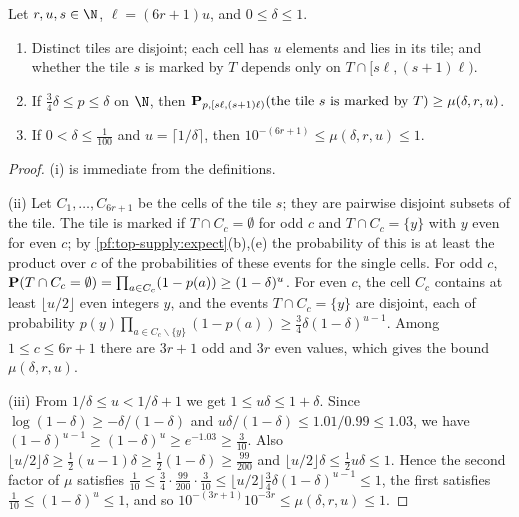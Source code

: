 \begin{lemma}\label{pf:top-supply:marked}
Let $r,u,s\in\N$, $\ell=(6r+1)u$, and $0\le\delta\le1$.
\begin{enumerate}[label=(\roman*)]
\item Distinct tiles are disjoint; each cell has $u$ elements and lies in its tile; and whether the tile $s$ is marked by
$T$ depends only on $T\cap[s\ell,(s+1)\ell)$.
\item If $\frac34\delta\le p\le\delta$ on $\N$, then $\mathbf{P}_{p,[s\ell,(s+1)\ell)}(\text{the tile }s\text{ is marked by }T)
\ge\mu(\delta,r,u)$.
\item If $0<\delta\le\frac1{100}$ and $u=\lceil1/\delta\rceil$, then $10^{-(6r+1)}\le\mu(\delta,r,u)\le1$.
\end{enumerate}
 
 
 
\end{lemma}

\begin{proof}
(i) is immediate from the definitions.

(ii) Let $C_1,\dots,C_{6r+1}$ be the cells of the tile $s$; they are pairwise disjoint subsets of the tile. The tile is
marked if $T\cap C_c=\emptyset$ for odd $c$ and $T\cap C_c=\{y\}$ with $y$ even for even $c$; by
\cref{pf:top-supply:expect}(b),(e) the probability of this is at least the product over $c$ of the probabilities of these
events for the single cells. For odd $c$, $\mathbf{P}(T\cap C_c=\emptyset)=\prod_{a\in C_c}(1-p(a))\ge(1-\delta)^u$. For
even $c$, the cell $C_c$ contains at least $\lfloor u/2\rfloor$ even integers $y$, and the events $T\cap C_c=\{y\}$ are
disjoint, each of probability $p(y)\prod_{a\in C_c\smallsetminus\{y\}}(1-p(a))\ge\frac34\delta(1-\delta)^{u-1}$. Among
$1\le c\le6r+1$ there are $3r+1$ odd and $3r$ even values, which gives the bound $\mu(\delta,r,u)$.

(iii) From $1/\delta\le u<1/\delta+1$ we get $1\le u\delta\le1+\delta$. Since $\log(1-\delta)\ge-\delta/(1-\delta)$ and
$u\delta/(1-\delta)\le1.01/0.99\le1.03$, we have $(1-\delta)^{u-1}\ge(1-\delta)^u\ge e^{-1.03}\ge\frac3{10}$. Also
$\lfloor u/2\rfloor\delta\ge\frac12(u-1)\delta\ge\frac12(1-\delta)\ge\frac{99}{200}$ and $\lfloor u/2\rfloor\delta\le\frac12u\delta\le1$.
Hence the second factor of $\mu$ satisfies
$\frac1{10}\le\frac34\cdot\frac{99}{200}\cdot\frac3{10}\le\lfloor u/2\rfloor\frac34\delta(1-\delta)^{u-1}\le1$, the first
satisfies $\frac1{10}\le(1-\delta)^u\le1$, and so $10^{-(3r+1)}10^{-3r}\le\mu(\delta,r,u)\le1$.
\end{proof}

